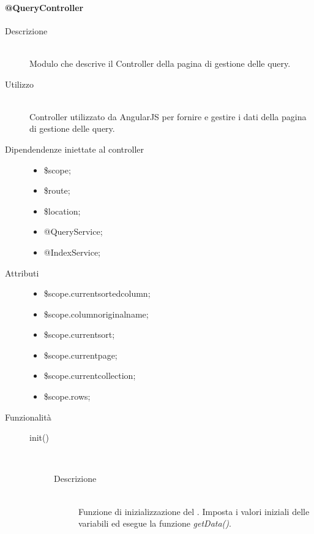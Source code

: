 \paragraph{@QueryController}
\begin{description}
 \item[Descrizione] \hfill \\
 Modulo che descrive il Controller della pagina di gestione delle query.
 
 \item[Utilizzo] \hfill \\
 Controller utilizzato da AngularJS per fornire e gestire i dati della pagina di gestione delle query.
 
 
 \item[Dipendendenze iniettate al controller] \hfill
 \begin{itemize}
  \item \$scope;
  \item \$route;
  \item \$location;
  \item @QueryService;
  \item @IndexService;
 \end{itemize}
 
 \item[Attributi] \hfill
 \begin{itemize}
 \item \$scope.current\textunderscore sorted\textunderscore column;
 \item \$scope.column\textunderscore original\textunderscore name;
 \item \$scope.current\textunderscore sort;
 \item \$scope.current\textunderscore page;
 \item \$scope.current\textunderscore collection;
 \item \$scope.rows;
 \end{itemize}
 
 \item[Funzionalità] \hfill
 \begin{description}
  \item[init()] \hfill \\
  \begin{description}
  	\item[Descrizione] \hfill \\
  Funzione di inizializzazione del . Imposta i valori iniziali delle variabili ed esegue la funzione \textit{getData()}.
  \end{description}
  

\end{description}
\end{description}

